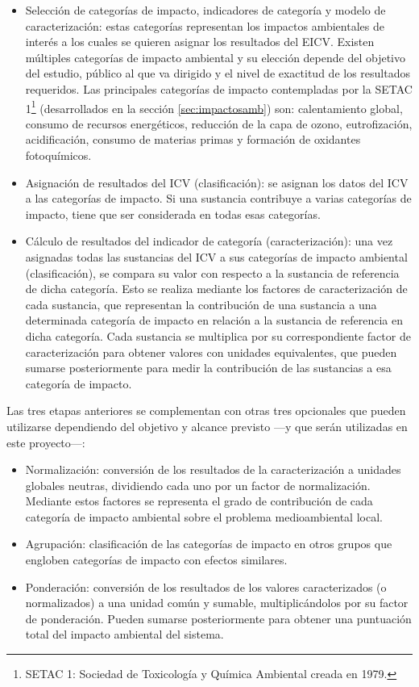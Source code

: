 \begin{itemize}
  \item Selección de categorías de impacto, indicadores de categoría y modelo de caracterización: estas categorías representan los impactos ambientales de interés a los cuales se quieren asignar los resultados del EICV. Existen múltiples categorías de impacto ambiental y su elección depende del objetivo del estudio, público al que va dirigido y el nivel de exactitud de los resultados requeridos. Las principales categorías de impacto contempladas por la SETAC 1\footnote{SETAC 1: Sociedad de Toxicología y Química Ambiental creada en 1979.} (desarrollados en la sección \ref{sec:impactosamb}) son: calentamiento global, consumo de recursos energéticos, reducción de la capa de ozono, eutrofización, acidificación, consumo de materias primas y formación de oxidantes fotoquímicos.
  \item Asignación de resultados del ICV (clasificación): se asignan los datos del ICV a las categorías de impacto. Si una sustancia contribuye a varias categorías de impacto, tiene que ser considerada en todas esas categorías.
  \item Cálculo de resultados del indicador de categoría (caracterización): una vez asignadas todas las sustancias del ICV a sus categorías de impacto ambiental (clasificación), se compara su valor con respecto a la sustancia de referencia de dicha categoría. Esto se realiza mediante los factores de caracterización de cada sustancia, que representan la contribución de una sustancia a una determinada categoría de impacto en relación a la sustancia de referencia en dicha categoría. Cada sustancia se multiplica por su correspondiente factor de caracterización para obtener valores con unidades equivalentes, que pueden sumarse posteriormente para medir la contribución de las sustancias a esa categoría de impacto.
\end{itemize}

Las tres etapas anteriores se complementan con otras tres opcionales que pueden utilizarse dependiendo del objetivo y alcance previsto —y que serán utilizadas en este proyecto—:

\begin{itemize}
  \item Normalización: conversión de los resultados de la caracterización a unidades globales neutras, dividiendo cada uno por un factor de normalización. Mediante estos factores se representa el grado de contribución de cada categoría de impacto ambiental sobre el problema medioambiental local.
  \item Agrupación: clasificación de las categorías de impacto en otros grupos que engloben categorías de impacto con efectos similares.
  \item Ponderación: conversión de los resultados de los valores caracterizados (o normalizados) a una unidad común y sumable, multiplicándolos por su factor de ponderación. Pueden sumarse posteriormente para obtener una puntuación total del impacto ambiental del sistema.
\end{itemize}

